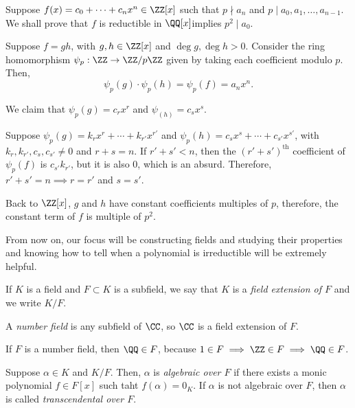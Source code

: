 
\begin{dem}
	Suppose $f(x) = c_0 + \cdots + c_nx^n \in \ZZ[x]$ such that $p \nmid a_n$ and $p \mid a_0, a_1, \dots, a_{n-1}$. We shall prove that $f$ is reductible in $\QQ[x]$implies $p^2 \mid a_0$.

	Suppose $f = gh$, with $g, h \in \ZZ[x]$ and $\deg g, \deg h > 0$.
	Consider the ring homomorphism $\psi_p: \ZZ \to \ZZ/p\ZZ$ given by taking each coefficient modulo $p$. Then, 
	\[ \psi_p(g)\cdot\psi_p(h) = \psi_p(f) = a_nx^n.\]

	We claim that $\psi_p(g) = c_rx^r$ and $\psi_(h) = c_sx^s$. 

	Suppose $\psi_p(g) = k_rx^r + \cdots + k_{r'}x^{r'}$ and $\psi_p(h) = c_sx^s + \cdots + c_{s'}x^{s'}$, with $k_r, k_{r'}, c_s, c_{s'} \neq 0$ and $r + s = n$. If $r' + s' < n$, then the $(r' + s')^\mathrm{th}$ coefficient of  $\psi_p(f)$ is $c_{s'}k_{r'}$, but it is also  $0$, which is an absurd. Therefore, $r' + s' = n \implies r = r'$ and $s = s'$.

	Back to $\ZZ[x]$,  $g$ and $h$ have constant coefficients multiples of $p$, therefore, the constant term of $f$ is multiple of $p^2$. 
\end{dem}

From now on, our focus will be constructing fields and studying their properties and knowing how to tell when a polynomial is irreductible will be extremely helpful.

\begin{defn}
	If $K$ is a field and $F \subset K$ is a subfield, we say that $K$ is a \emph{field extension of $F$} and we write $K / F$.
\end{defn} 

\begin{exmp}
	A \emph{number field} is any subfield of $\CC$, so $\CC$ is a field extension of $F$. 

	If $F$ is a number field, then $\QQ \in F$, because $1 \in F \implies \ZZ \in F \implies \QQ \in F$.
\end{exmp}

\begin{defn}
	Suppose $\alpha \in K$ and $K / F$. Then, $\alpha$ is \emph{algebraic over $F$} if there exists a monic polynomial $f \in F[x]$ such taht  $f(\alpha) = 0_K$.
	If $\alpha$ is not algebraic over $F$, then $\alpha$ is called \emph{transcendental over $F$}.
\end{defn}

